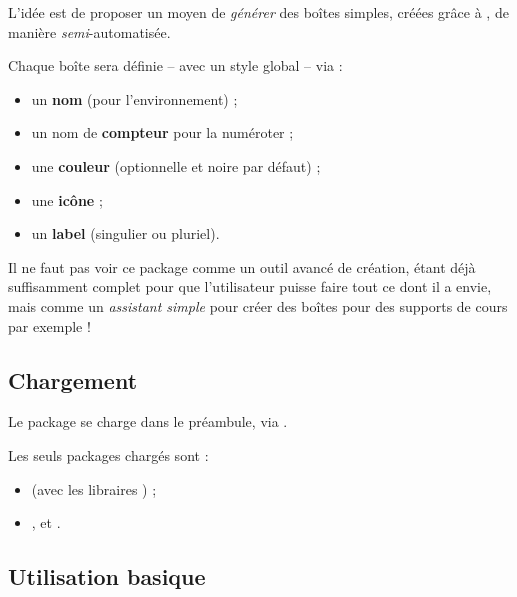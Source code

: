 \documentclass[french,11pt,a4paper]{article}
\begin{document}
L'idée est de proposer un moyen de \textit{générer} des boîtes simples, créées grâce à , de manière \textit{semi}-automatisée.

\smallskip

Chaque boîte sera définie -- avec un style global -- via :

\begin{itemize}
	\item un \textbf{nom} (pour l'environnement) ;
	\item un nom de \textbf{compteur} pour la numéroter ;
	\item une \textbf{couleur} (optionnelle et noire par défaut) ;
	\item une \textbf{icône} ;
	\item un \textbf{label} (singulier ou pluriel).
\end{itemize}

\medskip

Il ne faut pas voir ce package comme un outil avancé de création,  étant déjà suffisamment complet pour que l'utilisateur puisse faire tout ce dont il a envie, mais comme un \textit{assistant simple} pour créer des boîtes pour des supports de cours par exemple !

\subsection{Chargement}

Le package se charge dans le préambule, via .

Les seuls packages chargés sont :

\begin{itemize}
	\item {} (avec les libraires ) ;
	\item {},  et .
\end{itemize}

\begin{codehigh}[language=latex/latex2,style/main=cyan!10,style/code=cyan!10]
\usepackage{CreationBoites}
\end{codehigh}

\subsection{Utilisation basique}
\end{document}
